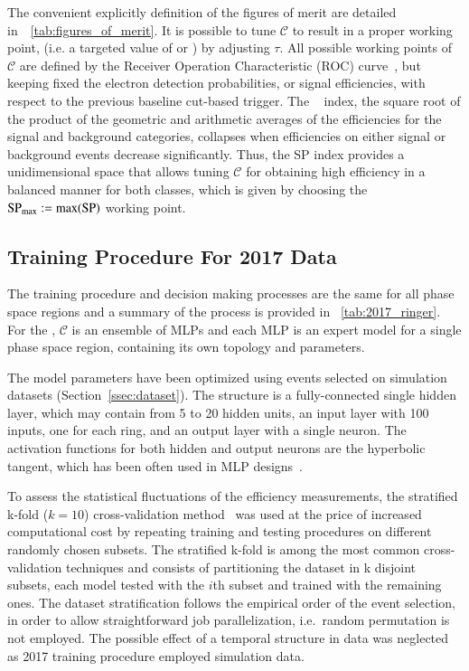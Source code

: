 The convenient explicitly definition of the figures of merit are detailed in~\tablename~\ref{tab:figures_of_merit}.
It is possible to tune $\mathcal{C}$ to result in a proper working point, (i.e. a targeted value of \pd{} or \pf{}) by adjusting $\tau$. All possible working points of $\mathcal{C}$ are defined by the Receiver Operation Characteristic (ROC) curve~\cite{van_trees_part1}, but keeping fixed the electron detection probabilities, or signal efficiencies, with respect to the previous baseline cut-based trigger. The \spindex{}~\cite{dos2006neural} index, the square root of the product of the geometric and arithmetic averages of the efficiencies for the signal and background categories, collapses when efficiencies on either signal or background events decrease significantly. Thus, the SP index provides a unidimensional space that allows tuning $\mathcal{C}$ for obtaining high efficiency in a balanced manner for both classes, which is given by choosing the $\text{SP}_{\text{max}}{}:=\max(\text{SP}{})$ working point.











\subsection{Training Procedure For 2017 Data}\label{ssec:2017}

The training procedure and decision making processes are the same for all phase
space regions and a summary of the process is provided in
\tablename~\ref{tab:2017_ringer}. For the \rnn{}, $\mathcal{C}$ is an ensemble of
MLPs and each MLP is an expert model for a single phase space
region, containing its own topology and parameters.

The model parameters have been optimized using events selected on simulation datasets
(Section~\ref{ssec:dataset}). The structure is a fully-connected single
hidden layer, which may contain from 5 to 20 hidden units, an input layer with 100 inputs, one for each ring, and an output layer with a single neuron. The activation
functions for both hidden and output neurons are the hyperbolic tangent, which has been often used in MLP designs~\cite{haykin_2008}. 

To assess the statistical fluctuations of the efficiency measurements, the stratified k-fold ($k=10$) cross-validation method~\cite{haykin_2008} was used at the price of increased computational cost by repeating training and testing procedures on different
randomly chosen subsets. The stratified k-fold is
among the most common cross-validation techniques and consists of partitioning
the dataset in k disjoint subsets, each model tested with the $i$th subset and
trained with the remaining ones. The dataset stratification follows the
empirical order of the event selection, in order to allow straightforward job
parallelization, i.e.\ random permutation is not employed. The possible effect
of a temporal structure in data was neglected as 2017 training procedure
employed simulation data.

